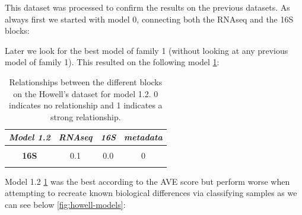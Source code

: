 \documentclass[
  12pt,
  a4paper,
  twoside,
  openright]{book}
\begin{document}
This dataset was processed to confirm the results on the previous datasets.
As always first we started with model 0, connecting both the RNAseq and the 16S blocks:

Later we look for the best model of family 1 (without looking at any previous model of family 1).
This resulted on the following model \ref{tab:howell-model1-2}:

\begin{table}[H]

\caption[Models 1.2 of Howell's dataset.]{\label{tab:howell-model1-2}Relationships between the different blocks on the Howell's dataset for model 1.2. 0 indicates no relationship and 1 indicates a strong relationship.}
\centering
\begin{tabular}[t]{|>{}c|c|c|>{}c|}
\hline
\em{\textbf{Model 1.2}} & \em{\textbf{RNAseq}} & \em{\textbf{16S}} & \em{\textbf{metadata}}\\
\hline
\textbf{\cellcolor{gray!6}{RNAseq}} & \cellcolor{gray!6}{0.0} & \cellcolor{gray!6}{0.1} & \cellcolor{gray!6}{1}\\
\hline
\textbf{16S} & 0.1 & 0.0 & 0\\
\hline
\textbf{\cellcolor{gray!6}{metadata}} & \cellcolor{gray!6}{1.0} & \cellcolor{gray!6}{0.0} & \cellcolor{gray!6}{0}\\
\hline
\end{tabular}
\end{table}

Model 1.2 \ref{tab:howell-model1-2} was the best according to the AVE score but perform worse when attempting to recreate known biological differences via classifying samples as we can see below \ref{fig:howell-models}:
\end{document}
